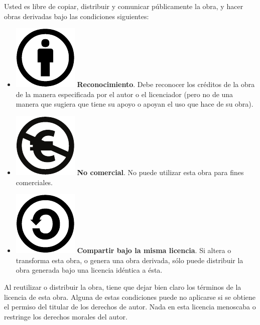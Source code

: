 Usted es libre de copiar, distribuir y comunicar públicamente la obra,
y hacer obras derivadas bajo las condiciones siguientes:
\begin{itemize}
\item \includegraphics[scale=0.35]{Logos/by} \textbf{Reconocimiento}.
Debe reconocer los créditos de la obra de la manera especificada por
el autor o el licenciador (pero no de una manera que sugiera que tiene
su apoyo o apoyan el uso que hace de su obra). 
\item \includegraphics[scale=0.35]{Logos/nc-eu} \textbf{No comercial}.
No puede utilizar esta obra para fines comerciales. 
\item \includegraphics[scale=0.35]{Logos/sa} \textbf{Compartir bajo la
misma licencia}. Si altera o transforma esta obra, o genera una obra
derivada, sólo puede distribuir la obra generada bajo una licencia
idéntica a ésta. 
\end{itemize}
Al reutilizar o distribuir la obra, tiene que dejar bien claro los
términos de la licencia de esta obra. Alguna de estas condiciones
puede no aplicarse si se obtiene el permiso del titular de los derechos
de autor. Nada en esta licencia menoscaba o restringe los derechos
morales del autor.

